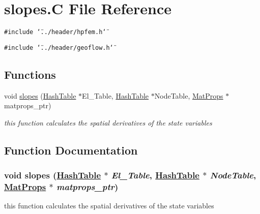 \hypertarget{slopes_8C}{
\section{slopes.C File Reference}
\label{slopes_8C}
}
{\tt \#include \char`\"{}../header/hpfem.h\char`\"{}}\par
{\tt \#include \char`\"{}../header/geoflow.h\char`\"{}}\par
\subsection*{Functions}
\begin{CompactItemize}
\item 
void \hyperlink{slopes_8C_a0}{slopes} (\hyperlink{classHashTable}{Hash\-Table} $\ast$El\_\-Table, \hyperlink{classHashTable}{Hash\-Table} $\ast$Node\-Table, \hyperlink{structMatProps}{Mat\-Props} $\ast$matprops\_\-ptr)
\begin{CompactList}\small\item\em this function calculates the spatial derivatives of the state variables \item\end{CompactList}\end{CompactItemize}


\subsection{Function Documentation}
\hypertarget{slopes_8C_a0}{
\subsubsection[slopes]{\setlength{\rightskip}{0pt plus 5cm}void slopes (\hyperlink{classHashTable}{Hash\-Table} $\ast$ {\em El\_\-Table}, \hyperlink{classHashTable}{Hash\-Table} $\ast$ {\em Node\-Table}, \hyperlink{structMatProps}{Mat\-Props} $\ast$ {\em matprops\_\-ptr})}}
\label{slopes_8C_a0}


this function calculates the spatial derivatives of the state variables 

